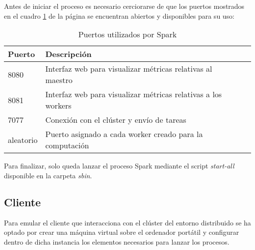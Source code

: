 Antes de iniciar el proceso es necesario cerciorarse de que los puertos mostrados en el cuadro \ref{puertos-spark} de la página \pageref{puertos-spark} se encuentran abiertos y disponibles para su uso:\\

\begin{table}[h!]
	\centering
	\begin{tabular}{|l||l|l|l|}
		
		\hline
		
		\textbf{Puerto} & \textbf{Descripción} \\
		
		\hline
		\hline
		
		8080 & Interfaz web para visualizar métricas relativas al maestro  \\
		
		\hline
		
		8081 & Interfaz web para visualizar métricas relativas a los workers \\
		
		\hline
		
		7077 & Conexión con el clúster y envío de tareas \\ 
		
		\hline
		
		aleatorio & Puerto asignado a cada worker creado para la computación \\
		
		\hline
		
	\end{tabular}
	\caption{Puertos utilizados por Spark}
	\label{puertos-spark}
\end{table}

Para finalizar, solo queda lanzar el proceso Spark mediante el script \textit{start-all} disponible en la carpeta \textit{sbin}.

\clearpage

\subsection{Cliente}

Para emular el cliente que interacciona con el clúster del entorno distribuido se ha optado por crear una máquina virtual sobre el ordenador portátil y configurar dentro de dicha instancia los elementos necesarios para lanzar los procesos.

